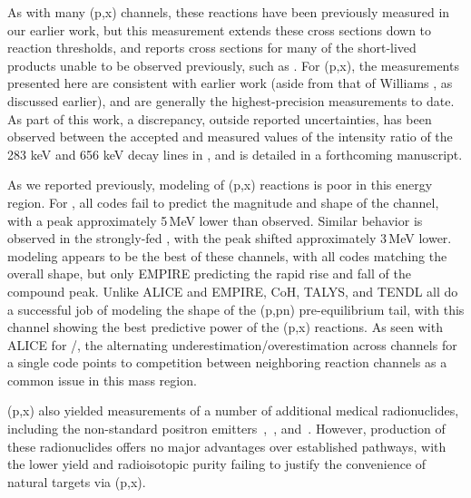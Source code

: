 As with many (p,x) channels, these reactions have been previously measured in our earlier work, but this measurement extends these cross sections down to reaction thresholds, and reports cross sections for many of the short-lived products unable to be observed previously, such as  \cite{Voyles2018a}.
For (p,x), the measurements presented here are consistent with earlier work (aside from that of Williams \cite{PhysRev.162.1055}, as discussed earlier), and are generally the highest-precision measurements to date.
As part of this work, a discrepancy, outside reported uncertainties, has been observed between the accepted and measured  values of the intensity ratio of the 283 keV and  656 keV decay lines in , and is detailed in a forthcoming manuscript.




As we reported previously, modeling of (p,x) reactions is poor in this energy region.
For , all codes fail to predict the magnitude and shape of the channel, with a peak approximately 5\,MeV lower than observed.
Similar behavior is observed in the strongly-fed ,
with the peak shifted approximately 3\,MeV lower.
 modeling appears to be the best of these channels, with all codes matching the overall shape, but only EMPIRE predicting the rapid rise and fall of the compound peak.
Unlike ALICE and EMPIRE, CoH, TALYS, and TENDL all do a successful job of modeling the shape of the (p,pn) pre-equilibrium tail, with this channel showing the best predictive power of the (p,x) reactions.
As seen with ALICE for /, the alternating underestimation/overestimation across channels for a single code points to competition between neighboring reaction channels as a common issue in this mass region.




(p,x)  also  yielded measurements of  a number of additional  medical  radionuclides,  including the non-standard positron emitters 
\,\cite{PMID:7632762,zweit1996medium,Graves2016,Rosch2014}, 
\,\cite{Szelecsenyi2005a,Fukumura2004}, and
\,\cite{Lewis2003,Bandari2014,mp500671j,Szelecsenyi1993,Aslam2009,Hilgers2003,Szelecsenyi2005,Voyles2017}.
However, production of these radionuclides  offers no major advantages over established  pathways, with the  lower yield and radioisotopic purity failing to justify the convenience of natural targets  via    (p,x). 



